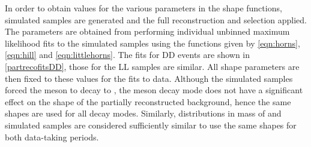 \begin{table}[h]
\centering
{}
\caption{The different partially reconstructed shapes for the \Dstar helicity states. The kinematic endpoints $a_i$ and $b_i$ can be different for each of the partially reconstructed shapes.}
\label{helicityamplitudes}
\end{table}

In order to obtain values for the various parameters in the shape functions, simulated samples are generated and the full reconstruction and selection applied. The parameters are obtained from performing individual unbinned maximum likelihood fits to the simulated samples using the functions given by \eqns\ref{eqn:horns}, \ref{eqn:hill} and \ref{eqn:littlehorns}. The fits for DD events are shown in \fig\ref{partrecofitsDD}, those for the LL samples are similar. All shape parameters are then fixed to these values for the fits to data. Although the simulated samples forced the \Dz meson to decay to \Km\pip, the \Dz meson decay mode does not have a significant effect on the shape of the partially reconstructed background, hence the same shapes are used for all \Dz decay modes. Similarly, distributions in \Bm mass of \runone and \runtwo simulated samples are considered sufficiently similar to use the same shapes for both data-taking periods.

